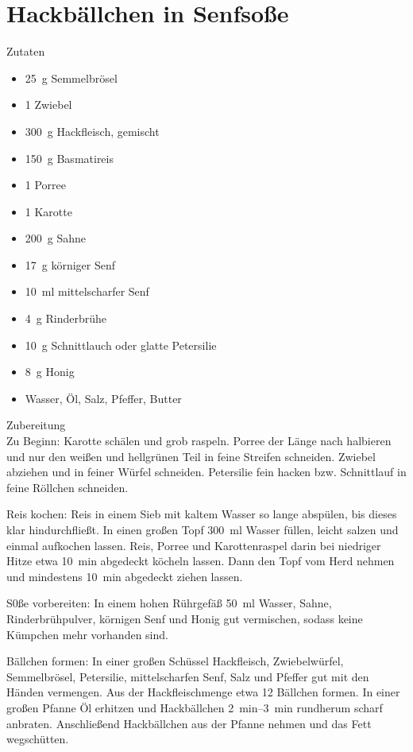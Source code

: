 \section*{Hackbällchen in Senfsoße}
\ihead{}\ohead{}
\cfoot{}
{\Large Zutaten}
\begin{multicols}{2}
\begin{itemize}
    \item \SI{25}{g} Semmelbrösel
    \item \num{1} Zwiebel
    \item \SI{300}{g} Hackfleisch, gemischt
    \item \SI{150}{g} Basmatireis
    \item \num{1} Porree
    \item \num{1} Karotte
    \item \SI{200}{g} Sahne
    \item \SI{17}{g} körniger Senf
    \item \SI{10}{ml} mittelscharfer Senf
    \item \SI{4}{g} Rinderbrühe
    \item \SI{10}{g} Schnittlauch oder glatte Petersilie
    \item \SI{8}{g} Honig
    \item Wasser, Öl, Salz, Pfeffer, Butter
\end{itemize}
\end{multicols}
\noindent
{\Large Zubereitung}\\
Zu Beginn: Karotte schälen und grob raspeln.
Porree der Länge nach halbieren und nur den weißen und hellgrünen Teil in feine Streifen schneiden.
Zwiebel abziehen und in feiner Würfel schneiden.
Petersilie fein hacken bzw. Schnittlauf in feine Röllchen schneiden.

Reis kochen: Reis in einem Sieb mit kaltem Wasser so lange abspülen, bis dieses klar hindurchfließt.
In einen großen Topf \SI{300}{ml} Wasser füllen, leicht salzen und einmal aufkochen lassen.
Reis, Porree und Karottenraspel darin bei niedriger Hitze etwa \SI{10}{min} abgedeckt köcheln lassen. 
Dann den Topf vom Herd nehmen und mindestens \SI{10}{min} abgedeckt ziehen lassen.

S0ße vorbereiten: In einem hohen Rührgefäß \SI{50}{ml} Wasser, Sahne, Rinderbrühpulver, körnigen Senf und Honig gut vermischen, sodass keine Kümpchen mehr vorhanden sind. 

Bällchen formen: In einer großen Schüssel Hackfleisch, Zwiebelwürfel, Semmelbrösel, Petersilie, mittelscharfen Senf, Salz und Pfeffer gut mit den Händen vermengen. 
Aus der Hackfleischmenge etwa \num{12} Bällchen formen. 
In einer großen Pfanne Öl erhitzen und Hackbällchen \SIrange{2}{3}{min} rundherum scharf anbraten.
Anschließend Hackbällchen aus der Pfanne nehmen und das Fett wegschütten. 

